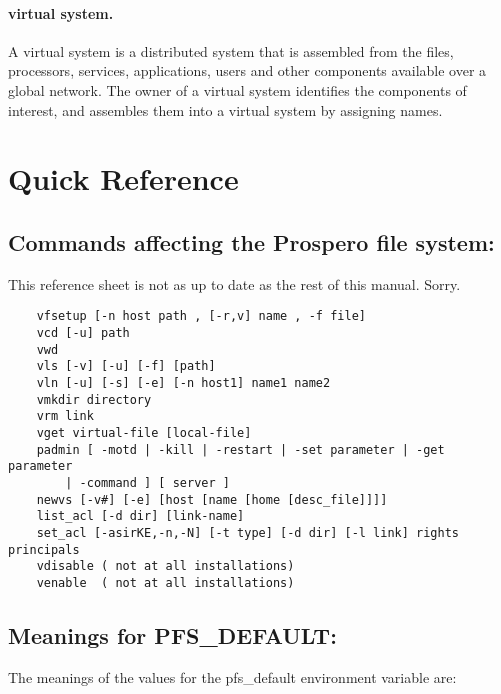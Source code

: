 \paragraph{virtual system.}  A virtual system is a distributed system
that is assembled from the files, processors, services, applications,
users and other components available over a global network.  The owner
of a virtual system identifies the components of interest, and
assembles them into a virtual system by assigning names.  

\newpage
\section{Quick Reference}

\subsection*{Commands affecting the Prospero file system:}

This reference sheet is not as up to date as the rest of this manual.
Sorry.

\begin{verbatim}
    vfsetup [-n host path , [-r,v] name , -f file]
    vcd [-u] path
    vwd
    vls [-v] [-u] [-f] [path]
    vln [-u] [-s] [-e] [-n host1] name1 name2
    vmkdir directory
    vrm link
    vget virtual-file [local-file]
    padmin [ -motd | -kill | -restart | -set parameter | -get parameter 
		| -command ] [ server ]
    newvs [-v#] [-e] [host [name [home [desc_file]]]]
    list_acl [-d dir] [link-name]
    set_acl [-asirKE,-n,-N] [-t type] [-d dir] [-l link] rights principals
    vdisable ( not at all installations)
    venable  ( not at all installations)
\end{verbatim}

\vspace{-.25in}
\subsection*{Meanings for PFS\_DEFAULT:}
\vspace{-.12in}

The meanings of the values for the {\sc pfs\_default} environment variable
are:

